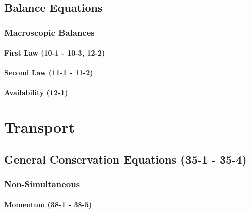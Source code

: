 \documentclass{mitqualif}
\begin{document}
\section{Balance Equations}
\subsection{Macroscopic Balances}
\subsubsection{First Law (10-1 - 10-3, 12-2)}



%

\subsubsection{Second Law (11-1 - 11-2)}


\subsubsection{Availability (12-1)}

\newpage
\chapter{Transport}
\section{General Conservation Equations (35-1 - 35-4)}





\subsection{Non-Simultaneous}
\subsubsection{Momentum (38-1 - 38-5)}




















%

















\end{document}
